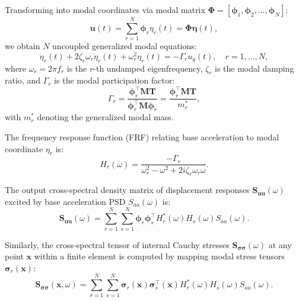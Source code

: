 Transforming into modal coordinates via modal matrix $\boldsymbol{\Phi} = [\boldsymbol{\phi}_1, \boldsymbol{\phi}_2, \dots, \boldsymbol{\phi}_N]$:
\begin{equation}
\mathbf{u}(t) = \sum_{r=1}^{N} \boldsymbol{\phi}_r \eta_r(t) = \boldsymbol{\Phi} \boldsymbol{\eta}(t),
\label{eq:modal_decomposition}
\end{equation}
we obtain $N$ uncoupled generalized modal equations:
\begin{equation}
\ddot{\eta}_r(t) + 2\zeta_r \omega_r \dot{\eta}_r(t) + \omega_r^2 \eta_r(t) = -\Gamma_r \ddot{u}_g(t), \quad r = 1, \dots, N,
\label{eq:uncoupled_modal_eq}
\end{equation}
where $\omega_r = 2\pi f_r$ is the $r$-th undamped eigenfrequency, $\zeta_r$ is the modal damping ratio, and $\Gamma_r$ is the modal participation factor:
\begin{equation}
\Gamma_r = \frac{\boldsymbol{\phi}_r^\top \mathbf{M} \mathbf{T}}{\boldsymbol{\phi}_r^\top \mathbf{M} \boldsymbol{\phi}_r} = \frac{\boldsymbol{\phi}_r^\top \mathbf{M} \mathbf{T}}{m_r^*},
\label{eq:modal_participation_factor}
\end{equation}
with $m_r^*$ denoting the generalized modal mass.

The frequency response function (FRF) relating base acceleration to modal coordinate $\eta_r$ is:
\begin{equation}
H_r(\omega) = \frac{-\Gamma_r}{\omega_r^2 - \omega^2 + 2i \zeta_r \omega_r \omega}.
\label{eq:modal_frf}
\end{equation}

The output cross-spectral density matrix of displacement responses $\mathbf{S}_{\mathbf{uu}}(\omega)$ excited by base acceleration PSD $S_{aa}(\omega)$ is:
\begin{equation}
\mathbf{S}_{\mathbf{uu}}(\omega) = \sum_{r=1}^{N} \sum_{s=1}^{N} \boldsymbol{\phi}_r \boldsymbol{\phi}_s^\top H_r^*(\omega) H_s(\omega) S_{aa}(\omega).
\label{eq:cross_spectral_displacement}
\end{equation}

Similarly, the cross-spectral tensor of internal Cauchy stresses $\mathbf{S}_{\boldsymbol{\sigma}\boldsymbol{\sigma}}(\omega)$ at any point $\mathbf{x}$ within a finite element is computed by mapping modal stress tensors $\boldsymbol{\sigma}_r(\mathbf{x})$:
\begin{equation}
\mathbf{S}_{\boldsymbol{\sigma}\boldsymbol{\sigma}}(\mathbf{x}, \omega) = \sum_{r=1}^{N} \sum_{s=1}^{N} \boldsymbol{\sigma}_r(\mathbf{x}) \boldsymbol{\sigma}_s^\top(\mathbf{x}) H_r^*(\omega) H_s(\omega) S_{aa}(\omega).
\label{eq:stress_psd_tensor}
\end{equation}

